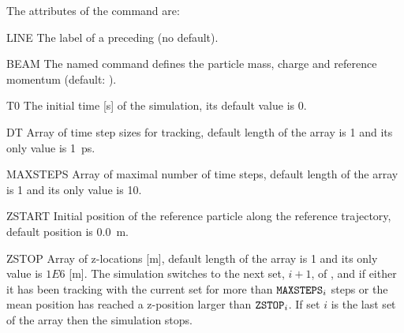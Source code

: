 The attributes of the command are:
\begin{kdescription}
\item[LINE]
  The label of a preceding  
   (no default).
\item[BEAM]
  \sloppy The named  command defines the particle mass, charge
  and reference momentum (default: ).
\item[T0]
 The initial time [\si{\second}] of the simulation, its default value is 0.
\item[DT]
  Array of  time step sizes for tracking, default length of the array is 1 and its only value is \SI{1}{\pico\second}.
\item[MAXSTEPS]
  Array of maximal number of time steps, default length of the array is 1 and its only value is 10.
\item[ZSTART]
  Initial position of the reference particle along the reference trajectory, default position is \SI{0.0}{\meter}.
\item[ZSTOP]
  Array of z-locations [m], default length of the array is 1 and its only value is $1E6$ [m]. The simulation switches to the next set, $i+1$, of ,  and  if either it has been tracking with the current set for more than $\text{\keyword{MAXSTEPS}}_i$ steps or the mean position has reached a z-position larger than $\text{\keyword{ZSTOP}}_i$. If set $i$ is the last set of the array then the simulation stops.


\end{kdescription}

